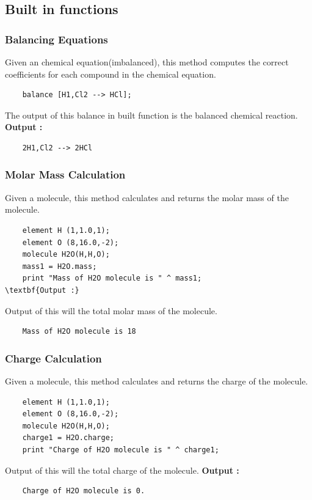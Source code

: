 \documentclass[english,a4paper,12pt]{report}
\begin{document}
\subsection{Built in functions}
\subsubsection{Balancing Equations}
Given an chemical equation(imbalanced), this method computes the correct coefficients for each compound in the chemical equation.
\begin{verbatim}
    balance [H1,Cl2 --> HCl];
\end{verbatim}
The output of this balance in built function is the balanced chemical reaction.\\
\textbf{Output :} \begin{verbatim}
    2H1,Cl2 --> 2HCl
\end{verbatim}
\subsubsection{Molar Mass Calculation}
Given a molecule, this method calculates and returns the molar mass of the molecule.
\begin{verbatim}
    element H (1,1.0,1);
    element O (8,16.0,-2);
    molecule H2O(H,H,O);
    mass1 = H2O.mass;
    print "Mass of H2O molecule is " ^ mass1;
\textbf{Output :}\end{verbatim}
Output of this will the total molar mass of the molecule.
\begin{verbatim}
    Mass of H2O molecule is 18
\end{verbatim}

\subsubsection{Charge Calculation}
Given a molecule, this method calculates and returns the charge of the molecule.
\begin{verbatim}
    element H (1,1.0,1);
    element O (8,16.0,-2);
    molecule H2O(H,H,O);
    charge1 = H2O.charge;
    print "Charge of H2O molecule is " ^ charge1;
\end{verbatim}
Output of this will the total charge of the molecule.
\textbf{Output :}\begin{verbatim}
    Charge of H2O molecule is 0.
\end{verbatim}
\end{document}
